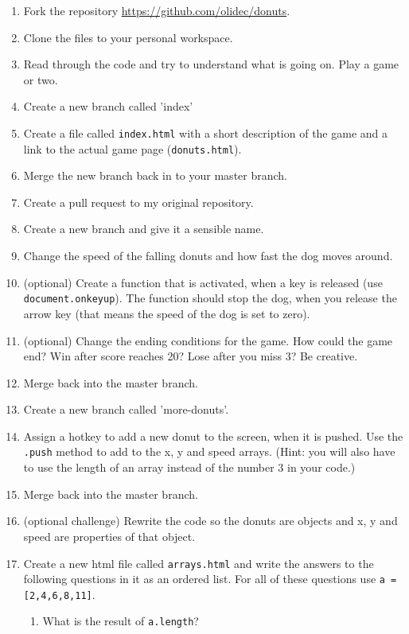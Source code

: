 \documentclass[english,11pt,a4paper]{report}
\begin{document}
\begin{ex}
\begin{enumerate}
\item Fork the repository \url{https://github.com/olidec/donuts}.
\item Clone the files to your personal workspace.
\item Read through the code and try to understand what is going on. Play a game or two.
\item Create a new branch called 'index'
\item Create a file called \verb|index.html| with a short description of the game and a link to the actual game page (\verb|donuts.html|).
\item Merge the new branch back in to your master branch.
\item Create a pull request to my original repository.
\item Create a new branch and give it a sensible name.
\item Change the speed of the falling donuts and how fast the dog moves around.
\item (optional) Create a function that is activated, when a key is released (use \verb|document.onkeyup|).  The function should stop the dog, when you release the arrow key (that means the speed of the dog is set to zero).
\item (optional) Change the ending conditions for the game. How could the game end? Win after score reaches 20? Lose after you miss 3? Be creative.
\item Merge back into the master branch.
\item Create a new branch called 'more-donuts'.
\item Assign a hotkey to add a new donut to the screen, when it is pushed. Use the \verb|.push| method to add to the x, y and speed arrays. (Hint: you will also have to use the length of an array instead of the number $3$ in your code.)
\item Merge back into the master branch.
\item (optional challenge) Rewrite the code so the donuts are objects and x, y and speed are properties of that object.
\item Create a new html file called \verb|arrays.html| and write the answers to the following questions in it as an ordered list. For all of these questions use \verb|a = [2,4,6,8,11]|.
\begin{enumerate}
\item What is the result of \verb|a.length|?

\end{enumerate}
\end{enumerate}
\end{ex}
\end{document}
